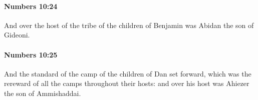 		\paragraph{Numbers 10:24} %
			\label{NUMBERS-10-24}

			And over the host of the tribe of the children of Benjamin was Abidan the son of Gideoni.


		\paragraph{Numbers 10:25} %
			\label{NUMBERS-10-25}

			And the standard of the camp of the children of Dan set forward, which was the rereward of all the camps throughout their hosts: and over his host was Ahiezer the son of Ammishaddai.


